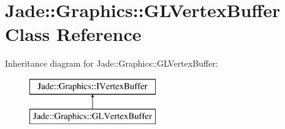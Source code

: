 \hypertarget{class_jade_1_1_graphics_1_1_g_l_vertex_buffer}{}\section{Jade\+:\+:Graphics\+:\+:G\+L\+Vertex\+Buffer Class Reference}
\label{class_jade_1_1_graphics_1_1_g_l_vertex_buffer}
Inheritance diagram for Jade\+:\+:Graphics\+:\+:G\+L\+Vertex\+Buffer\+:\begin{figure}[H]
\begin{center}
\leavevmode
\includegraphics[height=2.000000cm]{class_jade_1_1_graphics_1_1_g_l_vertex_buffer}
\end{center}
\end{figure}
